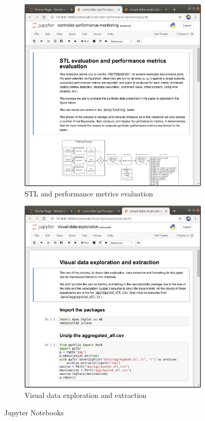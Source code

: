 \documentclass{uLatex}
\begin{document}
\begin{figure}[h!]
    \centering\noindent
    \begin{subfigure}[t]{.49\linewidth}
        \includegraphics[width=\linewidth]{notebook-1}
        \caption{STL and performance metrics evaluation}
    \end{subfigure}
    \hfill
    \begin{subfigure}[t]{.49\linewidth}
        \includegraphics[width=\linewidth]{notebook-2}
        \caption{Visual data exploration and extraction}
    \end{subfigure}
    \caption{Jupyter Notebooks}
    \label{fig:notebooks}
\end{figure}

\printbibliography
\end{document}
